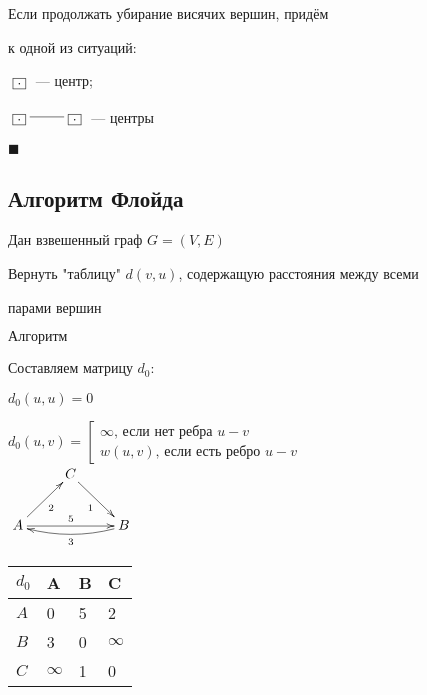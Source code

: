 \documentclass[a4paper, 12pt] {article}
\begin{document}
 Если продолжать убирание висячих вершин, придём 
 
 к одной из ситуаций:
 
 $ \begin{matrix}
 	\xymatrix{
 		 \fbox{.} \\
 	}
 \end{matrix} $ --- центр;

$ \begin{matrix}
	\xymatrix{
		\fbox{.} \ar@{-}[r] & \fbox{.} \\
	}
\end{matrix} $ --- центры

$ \blacksquare $\\

\newpage

\subsection{Алгоритм Флойда}
$  $\\

Дан взвешенный граф $ G = (V, E) $

Вернуть "таблицу"$  $ $ d(v, u) $, содержащую расстояния между всеми

парами вершин

$ Алгоритм $

Составляем матрицу $ d_{0} $:

$ d_{0} (u, u) = 0 $

$ d_{0} (u, v)=
\left[
\begin{array}{ccc}
	\infty \text{, если нет ребра } u-v  \\
	w (u, v)\text{, если есть ребро } u-v
\end{array}
\right.$\\
 
 $ \begin{matrix}
 	\xymatrix{
 		 & C \ar@{->}[rd]_1 \\
 		A \ar@{->}[rr]^5 \ar@{->}[ru]_2 & & B \ar@/^/[ll]^3  \\
 	}
 \end{matrix} $

\begin{tabular}{ | l | l | l |  l |}
	\hline
	 $ d_{0} $ & A & B & C  \\ \hline
	$ A $ & 0 & 5 & 2 \\ \hline
	$ B $ & 3 &0 & $ \infty $ \\ \hline
	$ C $ & $ \infty $ & 1 & 0 \\ \hline
\end{tabular}\\
\end{document}
